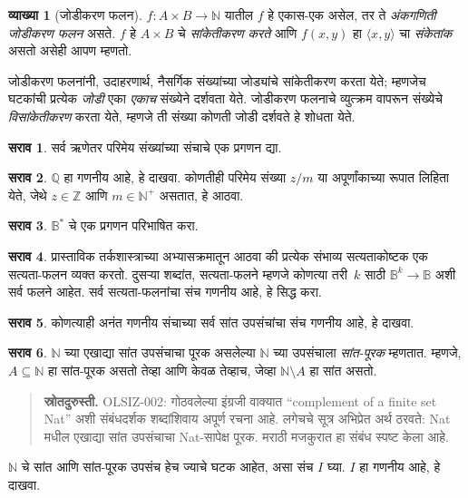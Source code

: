 \documentclass[11pt,a4paper,openany]{book}
\theoremstyle{definition}
\newtheorem{defn}{व्याख्या}[section]
\newtheorem{prob}{सराव}[chapter]
\newenvironment{explain}{}{}
\newcommand{\tuple}[1]{\langle #1\rangle}
\newcommand{\Nat}{\mathbb{N}}
\newcommand{\Int}{\mathbb{Z}}
\newcommand{\Rat}{\mathbb{Q}}
\newcommand{\Bin}{\mathbb{B}}
\begin{document}
\begin{defn}[जोडीकरण फलन]
  $f\colon A \times B \to \Nat$ यातील $f$ हे एकास-एक असेल, तर ते
  \emph{अंकगणिती जोडीकरण फलन} असते. $f$ हे $A \times B$ चे
  \emph{सांकेतीकरण करते} आणि $f(x,y)$ हा $\tuple{x,y}$ चा
  \emph{संकेतांक} असतो असेही आपण म्हणतो.
\end{defn}

\begin{explain}
जोडीकरण फलनांनी, उदाहरणार्थ, नैसर्गिक संख्यांच्या जोड्यांचे
सांकेतीकरण करता येते; म्हणजेच घटकांची प्रत्येक \emph{जोडी} एका
\emph{एकाच} संख्येने दर्शवता येते. जोडीकरण फलनाचे व्युत्क्रम वापरून
संख्येचे \emph{विसांकेतीकरण} करता येते, म्हणजे ती संख्या कोणती जोडी
दर्शवते हे शोधता येते.
\end{explain}

\begin{prob}
सर्व ऋणेतर परिमेय संख्यांच्या संचाचे एक प्रगणन द्या.
\end{prob}

\begin{prob}
$\Rat$ हा गणनीय आहे, हे दाखवा. कोणतीही परिमेय संख्या
$z/m$ या अपूर्णांकाच्या रूपात लिहिता येते, जेथे $z \in \Int$ आणि
$m \in \Nat^+$ असतात, हे आठवा.
\end{prob}

\begin{prob}
$\Bin^*$ चे एक प्रगणन परिभाषित करा.
\end{prob}

\begin{prob}
प्रास्ताविक तर्कशास्त्राच्या अभ्यासक्रमातून आठवा की प्रत्येक संभाव्य
सत्यताकोष्टक एक सत्यता-फलन व्यक्त करतो. दुसऱ्या शब्दांत, सत्यता-फलने
म्हणजे कोणत्या तरी~$k$ साठी $\Bin^k \to \Bin$ अशी सर्व फलने आहेत.
सर्व सत्यता-फलनांचा संच गणनीय आहे, हे सिद्ध करा.
\end{prob}

\begin{prob}
कोणत्याही अनंत गणनीय संचाच्या सर्व सांत उपसंचांचा संच
गणनीय आहे, हे दाखवा.
\end{prob}

\begin{prob}
$\Nat$ च्या एखाद्या सांत उपसंचाचा पूरक असलेल्या $\Nat$ च्या उपसंचाला
\emph{सांत-पूरक} म्हणतात. म्हणजे, $A \subseteq \Nat$ हा सांत-पूरक
असतो तेव्हा आणि केवळ तेव्हाच, जेव्हा $\Nat\setminus A$ हा सांत असतो.
\begin{quote}\small\textbf{स्रोतदुरुस्ती.} OLSIZ-002: गोठवलेल्या इंग्रजी वाक्यात “complement of a finite set Nat” अशी संबंधदर्शक शब्दांशिवाय अपूर्ण रचना आहे. लगेचचे सूत्र अभिप्रेत अर्थ ठरवते: Nat मधील एखाद्या सांत उपसंचाचा Nat-सापेक्ष पूरक. मराठी मजकुरात हा संबंध स्पष्ट केला आहे.\end{quote}
$\Nat$ चे सांत आणि सांत-पूरक उपसंच हेच ज्याचे घटक आहेत,
असा संच $I$ घ्या. $I$ हा गणनीय आहे, हे दाखवा.
\end{prob}
\end{document}
